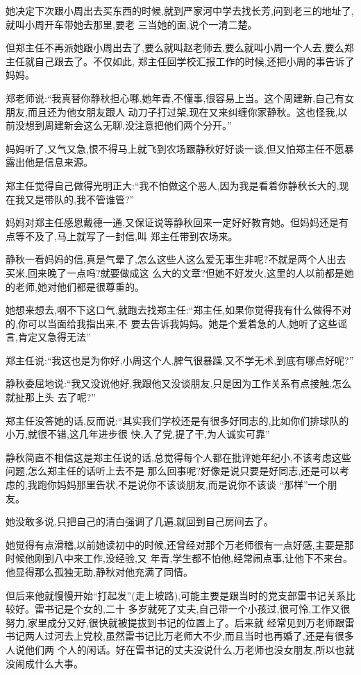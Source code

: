 ﻿\documentclass[12pt]{article}
\begin{document}
她决定下次跟小周出去买东西的时候,就到严家河中学去找长芳,问到老三的地址了,就叫小周开车带她去那里,要老
三当她的面,说个一清二楚。

但郑主任不再派她跟小周出去了,要么就叫赵老师去,要么就叫小周一个人去,要么郑主任就自己跟去了。不仅如此,
郑主任回学校汇报工作的时候,还把小周的事告诉了妈妈。

郑老师说:``我真替你静秋担心哪,她年青,不懂事,很容易上当。这个周建新,自己有女朋友,而且还为他女朋友跟人
动刀子打过架,现在又来纠缠你家静秋。这也怪我,以前没想到周建新会这么无聊,没注意把他们两个分开。''

妈妈听了,又气又急,恨不得马上就飞到农场跟静秋好好谈一谈,但又怕郑主任不愿暴露出他是信息来源。



郑主任觉得自己做得光明正大:``我不怕做这个恶人,因为我是看着你静秋长大的,现在我又是带队的,我不管谁管?''

妈妈对郑主任感恩戴德一通,又保证说等静秋回来一定好好教育她。但妈妈还是有点等不及了,马上就写了一封信,叫
郑主任带到农场来。

静秋一看妈妈的信,真是气晕了,怎么这些人这么爱无事生非呢?不就是两个人出去买米,回来晚了一点吗?就要做成这
么大的文章?但她不好发火,这里的人以前都是她的老师,她对他们都是很尊重的。

她想来想去,咽不下这口气,就跑去找郑主任:``郑主任,如果你觉得我有什么做得不对的,你可以当面给我指出来,不
要去告诉我妈妈。她是个爱着急的人,她听了这些谣言,肯定又急得无法\myrule ''

郑主任说:``我这也是为你好,小周这个人,脾气很暴躁,又不学无术,到底有哪点好呢?''

静秋委屈地说:``我又没说他好,我跟他又没\myrule 谈朋友,只是因为工作关系有点接触,怎么就\myrule 扯那上头
去了呢?''

郑主任没答她的话,反而说:``其实我们学校还是有很多好同志的,比如你们排球队的小万,就很不错,这几年进步很
快,入了党,提了干,为人诚实可靠\myrule ''

静秋简直不相信这是郑主任说的话,总觉得每个人都在批评她年纪小,不该考虑这些问题,怎么郑主任的话听上去不是
那么回事呢?好像是说只要是好同志,还是可以考虑的,我跑你妈妈那里告状,不是说你不该谈朋友,而是说你不该谈
``那样''一个朋友。

她没敢多说,只把自己的清白强调了几遍,就回到自己房间去了。

她觉得有点滑稽,以前她读初中的时候,还曾经对那个万老师很有一点好感,主要是那时候他刚到八中来工作,没经验,又
年青,学生都不怕他,经常闹点事,让他下不来台。他显得那么孤独无助,静秋对他充满了同情。

但后来他就慢慢开始``打起发''(走上坡路),可能主要是跟当时的党支部雷书记关系比较好。雷书记是个女的,二十
多岁就死了丈夫,自己带一个小孩过,很可怜,工作又很努力,家里成分又好,很快就被提拔到书记的位置上了。后来就
经常见到万老师跟雷书记两人过河去上党校,虽然雷书记比万老师大不少,而且当时也再婚了,还是有很多人说他们两
个人的闲话。好在雷书记的丈夫没说什么,万老师也没女朋友,所以也就没闹成什么大事。
\end{document}
